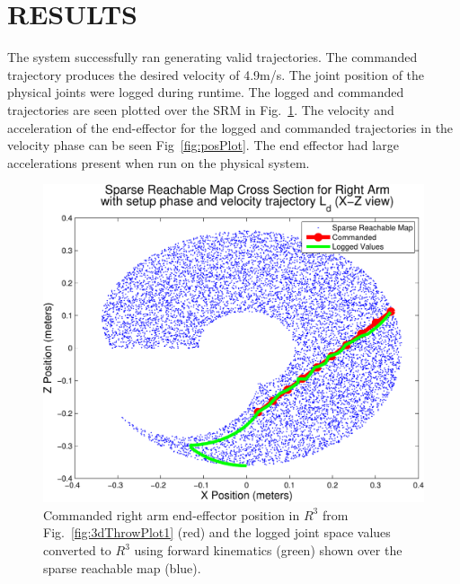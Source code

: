 \section{RESULTS}\label{sec:reslts}
The system successfully ran generating valid trajectories.  The commanded trajectory produces the desired velocity of 4.9m/s.  The joint position of the physical joints were logged during runtime.  The logged and commanded trajectories are seen plotted over the SRM in Fig.~\ref{fig:svmMap}.  The velocity and acceleration of the end-effector for the logged and commanded trajectories in the velocity phase can be seen Fig~\ref{fig:posPlot}.  The end effector had large accelerations present when run on the physical system.  

\begin{figure}[thpb]
  \centering
\includegraphics[width=1.0\columnwidth]{./MATLAB/throwTrajAct.pdf}
  \caption{Commanded right arm end-effector position in $R^3$ from Fig.~\ref{fig:3dThrowPlot1} (red) and the logged joint space values converted to $R^3$ using forward kinematics (green) shown over the sparse reachable map (blue).}
  \label{fig:svmMap}
\end{figure}

